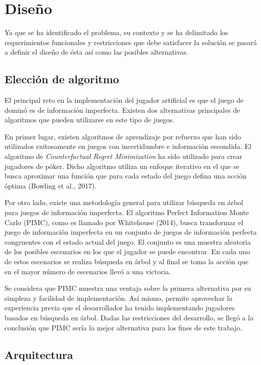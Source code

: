 \chapter{Diseño}

\noindent

Ya que se ha identificado el problema, su contexto y se ha delimitado los
requerimientos funcionales y restricciones que debe satisfacer la solución se
pasará a definir el diseño de ésta así como las posibles alternativas.

\section{Elección de algoritmo}

El principal reto en la implementación del jugador artificial es que el juego de
dominó es de información imperfecta. Existen dos alternativas principales de
algoritmos que pueden utilizarse en este tipo de juegos.

En primer lugar, existen algoritmos de aprendizaje por refuerzo que han sido
utilizados exitosamente en juegos con incertidumbre e información escondida. El
algoritmo de \textit{Counterfactual Regret Minimization} ha sido utilizado para
crear jugadores de póker. Dicho algoritmo utiliza un enfoque iterativo en el que
se busca aproximar una función que para cada estado del juego defina una acción
óptima (Bowling et al., 2017).

Por otro lado, existe una metodología general para utilizar búsqueda en árbol
para juegos de información imperfecta. El algoritmo Perfect Information Monte
Carlo (PIMC), como es llamado por Whitehouse (2014), busca transformar el juego
de información imperfecta en un conjunto de juegos de información perfecta
congruentes con el estado actual del juego. El conjunto es una muestra aleatoria
de los posibles escenarios en los que el jugador se puede encontrar. En cada uno
de estos escenarios se realiza búsqueda en árbol y al final se toma la acción
que en el mayor número de escenarios llevó a una victoria.

Se considera que PIMC muestra una ventaja sobre la primera alternativa por su
simpleza y facilidad de implementación. Así mismo, permite aprovechar la
experiencia previa que el desarrollador ha tenido implementando jugadores
basados en búsqueda en árbol. Dadas las restricciones del desarrollo, se llegó a
la conclusión que PIMC sería la mejor alternativa para los fines de este
trabajo.

\section{Arquitectura}

